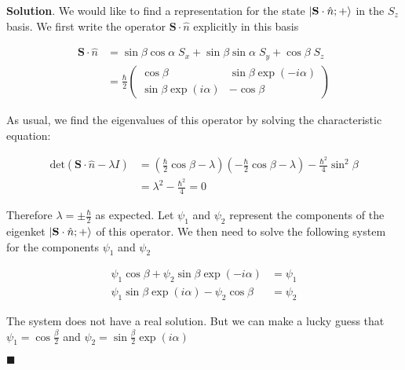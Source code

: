 \documentclass[12pt]{article}
\theoremstyle{definition}
\newenvironment{s}{%
        \begin{trivlist} \item \textbf{Solution}. }{%
            \hspace*{\fill} $\blacksquare$\end{trivlist}}%
\begin{document}
{\begin{s}
We would like to find a representation for the state $\ket{\mathbf{S}\cdot\hat{n}; +}$ in the $S_{z}$ basis. We first write the operator $\mathbf{S}\cdot\hat{n}$ explicitly in this basis

\begin{align*}
\mathbf{S}\cdot\hat{n} &= \sin\beta\cos\alpha \; S_{x} +\sin\beta\sin\alpha\;S_{y} + \cos\beta\; S_{z}\\
&= \frac{\hbar}{2}\begin{pmatrix}
\cos\beta & \sin\beta\exp(-i\alpha)\\
\sin\beta\exp(i\alpha) & -\cos\beta
\end{pmatrix}
\end{align*}

As usual, we find the eigenvalues of this operator by solving the characteristic equation:

\begin{align*}
\mathrm{det}\left(\mathbf{S}\cdot\hat{n} - \lambda I\right) &= \left(\frac{\hbar}{2}\cos\beta - \lambda\right)\left(-\frac{\hbar}{2}\cos\beta - \lambda\right) - \frac{\hbar^{2}}{4}\sin^{2}\beta\\
&= \lambda^{2} - \frac{\hbar^{2}}{4} = 0
\end{align*}

Therefore $\lambda = \pm \frac{\hbar}{2}$ as expected. Let $\psi_{1}$ and $\psi_{2}$ represent the components of the eigenket $\ket{\mathbf{S}\cdot\hat{n}; +}$ of this operator. We then need to solve the following system for the components $\psi_{1}$ and $\psi_{2}$

\begin{align*}
\psi_{1}\cos\beta+\psi_{2}\sin\beta\exp(-i\alpha) &= \psi_{1}\\
\psi_{1}\sin\beta\exp(i\alpha) - \psi_{2}\cos\beta &= \psi_{2}
\end{align*}

The system does not have a real solution. But we can make a lucky guess that $\psi_{1} = \cos\frac{\beta}{2}$ and $\psi_{2} = \sin\frac{\beta}{2}\exp(i\alpha)$


\end{s}
\end{document}
